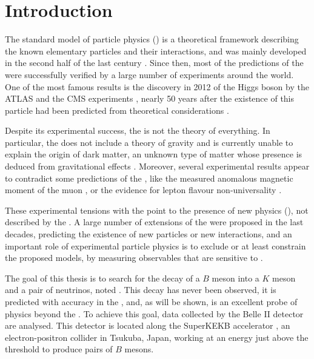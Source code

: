 \chapter{Introduction} \label{ch:introduction}
The standard model of particle physics (\SM) is a theoretical framework describing the known elementary particles and their interactions, and was mainly developed in the second half of the last century \cite{Glashow:1961tr,Weinberg:1967tq,Salam:1968rm,tHooft:1972tcz}.
Since then, most of the predictions of the \SM were successfully verified by a large number of experiments around the world.
One of the most famous results is the discovery in 2012 of the Higgs boson by the ATLAS and the CMS experiments \cite{ATLAS:2012yve,CMS:2012qbp}, nearly 50 years after the existence of this particle had been predicted from theoretical considerations \cite{Englert:1964et,Higgs:1964pj,Guralnik:1964eu}.

Despite its experimental success, the \SM is not the theory of everything.
In particular, the \SM does not include a theory of gravity and is currently unable to explain the origin of dark matter, an unknown type of matter whose presence is deduced from gravitational effects \cite{Zwicky:1937zza,Clowe:2006eq,Planck:2018vyg}.
Moreover, several experimental results appear to contradict some predictions of the \SM, like the measured anomalous magnetic moment of the muon \cite{Muong-2:2021ojo,Muong-2:2006rrc}, or the evidence for lepton flavour non-universality \cite{LHCb:2017avl,LHCb:2020lmf,LHCb:2020gog,LHCb:2021trn}.

These experimental tensions with the \SM point to the presence of new physics (\NP), not described by the \SM.
A large number of extensions of the \SM were proposed in the last decades, predicting the existence of new particles or new interactions, and an important role of experimental particle physics is to exclude or at least constrain the proposed models, by measuring observables that are sensitive to \NP.

The goal of this thesis is to search for the decay of a $B$ meson into a $K$ meson and a pair of neutrinos, noted \BKnn.
This decay has never been observed, it is predicted with accuracy in the \SM, and, as will be shown, is an excellent probe of physics beyond the \SM.
To achieve this goal, data collected by the Belle II detector \cite{Abe:2010gxa} are analysed.
This detector is located along the SuperKEKB accelerator \cite{AKAI2018188}, an electron-positron collider in Tsukuba, Japan, working at an energy just above the threshold to produce pairs of $B$ mesons.

